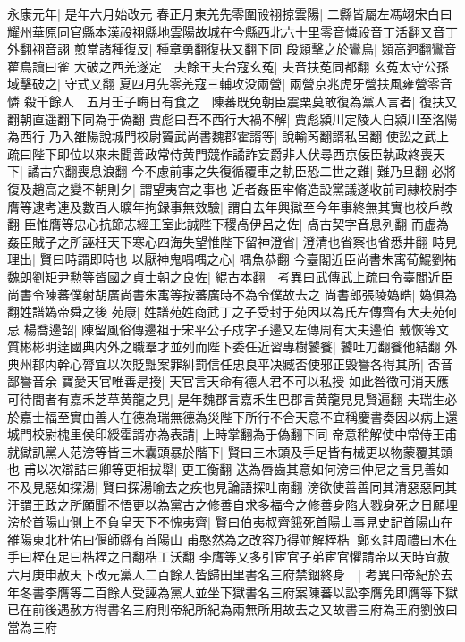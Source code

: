永康元年|{
	是年六月始改元}
春正月東羌先零圍祋祤掠雲陽|{
	二縣皆屬左馮翊宋白曰耀州華原同官縣本漢祋祤縣地雲陽故城在今縣西北六十里零音憐祋音丁活翻又音丁外翻祤音詡}
煎當諸種復反|{
	種章勇翻復扶又翻下同}
段熲擊之於鸞鳥|{
	熲高迥翻鸞音雚鳥讀曰雀}
大破之西羌遂定　夫餘王夫台寇玄菟|{
	夫音扶莬同都翻}
玄菟太守公孫域擊破之|{
	守式又翻}
夏四月先零羌寇三輔攻没兩營|{
	兩營京兆虎牙營扶風雍營零音憐}
殺千餘人　五月壬子晦日有食之　陳蕃既免朝臣震栗莫敢復為黨人言者|{
	復扶又翻朝直遥翻下同為于偽翻}
賈彪曰吾不西行大禍不解|{
	賈彪潁川定陵人自潁川至洛陽為西行}
乃入雒陽說城門校尉竇武尚書魏郡霍諝等|{
	說輸芮翻諝私呂翻}
使訟之武上疏曰陛下即位以來未聞善政常侍黄門競作譎詐妄爵非人伏尋西京佞臣執政終喪天下|{
	譎古穴翻喪息浪翻}
今不慮前事之失復循覆車之軌臣恐二世之難|{
	難乃旦翻}
必將復及趙高之變不朝則夕|{
	謂望夷宫之事也}
近者姦臣牢脩造設黨議遂收前司隷校尉李膺等逮考連及數百人曠年拘録事無效驗|{
	謂自去年興獄至今年事終無其實也校戶教翻}
臣惟膺等忠心抗節志經王室此誠陛下稷卨伊呂之佐|{
	卨古契字音息列翻}
而虚為姦臣賊子之所誣枉天下寒心四海失望惟陛下留神澄省|{
	澄清也省察也省悉井翻}
時見理出|{
	賢曰時謂即時也}
以厭神鬼喁喁之心|{
	喁魚恭翻}
今臺閣近臣尚書朱㝢荀鯤劉祐魏朗劉矩尹勲等皆國之貞士朝之良佐|{
	緄古本翻　考異曰武傳武上疏曰令臺閻近臣尚書令陳蕃僕射胡廣尚書朱㝢等按蕃廣時不為令僕故去之}
尚書郎張陵媯皓|{
	媯俱為翻姓譜媯帝舜之後}
苑康|{
	姓譜苑姓商武丁之子受封于苑因以為氏左傳齊有大夫苑何忌}
楊喬邊韶|{
	陳留風俗傳邊祖于宋平公子戍字子邊又左傳周有大夫邊伯}
戴恢等文質彬彬明逹國典内外之職羣才並列而陛下委任近習專樹饕餮|{
	饕吐刀翻餮他結翻}
外典州郡内幹心膂宜以次貶黜案罪糾罰信任忠良平决臧否使邪正毁譽各得其所|{
	否音鄙譽音余}
寶愛天官唯善是授|{
	天官言天命有德人君不可以私授}
如此咎徵可消天應可待間者有嘉禾芝草黄龍之見|{
	是年魏郡言嘉禾生巴郡言黄龍見見賢遍翻}
夫瑞生必於嘉士福至實由善人在德為瑞無德為災陛下所行不合天意不宜稱慶書奏因以病上還城門校尉槐里侯印綬霍諝亦為表請|{
	上時掌翻為于偽翻下同}
帝意稍解使中常侍王甫就獄訊黨人范滂等皆三木囊頭暴於階下|{
	賢曰三木頭及手足皆有械更以物蒙覆其頭也}
甫以次辯詰曰卿等更相拔舉|{
	更工衡翻}
迭為唇齒其意如何滂曰仲尼之言見善如不及見惡如探湯|{
	賢曰探湯喻去之疾也見論語探吐南翻}
滂欲使善善同其清惡惡同其汙謂王政之所願聞不悟更以為黨古之修善自求多福今之修善身陷大戮身死之日願埋滂於首陽山側上不負皇天下不愧夷齊|{
	賢曰伯夷叔齊餓死首陽山事見史記首陽山在雒陽東北杜佑曰偃師縣有首陽山}
甫愍然為之改容乃得並解桎梏|{
	鄭玄註周禮曰木在手曰桎在足曰梏桎之日翻梏工沃翻}
李膺等又多引宦官子弟宦官懼請帝以天時宜赦六月庚申赦天下改元黨人二百餘人皆歸田里書名三府禁錮終身　|{
	考異曰帝紀於去年冬書李膺等二百餘人受誣為黨人並坐下獄書名三府案陳蕃以訟李膺免即膺等下獄已在前後遇赦方得書名三府則帝紀所紀為兩無所用故去之又故書三府為王府劉攽曰當為三府}
